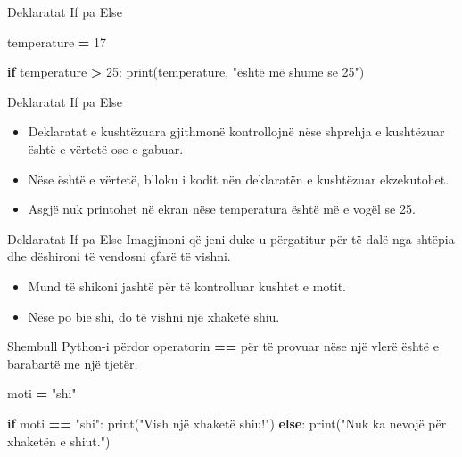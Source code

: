 \documentclass[
  ignorenonframetext,
]{beamer}
\newenvironment{Shaded}{\begin{snugshade}}{\end{snugshade}}
\newcommand{\BuiltInTok}[1]{#1}
\newcommand{\ControlFlowTok}[1]{\textcolor[rgb]{0.13,0.29,0.53}{\textbf{#1}}}
\newcommand{\DecValTok}[1]{\textcolor[rgb]{0.00,0.00,0.81}{#1}}
\newcommand{\NormalTok}[1]{#1}
\newcommand{\OperatorTok}[1]{\textcolor[rgb]{0.81,0.36,0.00}{\textbf{#1}}}
\newcommand{\StringTok}[1]{\textcolor[rgb]{0.31,0.60,0.02}{#1}}
\begin{document}
\begin{frame}[fragile]{Deklaratat If pa Else}
\protect\hypertarget{deklaratat-if-pa-else-1}{}
\begin{Shaded}
\begin{Highlighting}[]
\NormalTok{temperature }\OperatorTok{=} \DecValTok{17}

\ControlFlowTok{if}\NormalTok{ temperature }\OperatorTok{\textgreater{}} \DecValTok{25}\NormalTok{:}
  \BuiltInTok{print}\NormalTok{(temperature, }\StringTok{"është më shume se 25"}\NormalTok{)  }
\end{Highlighting}
\end{Shaded}
\end{frame}

\begin{frame}{Deklaratat If pa Else}
\protect\hypertarget{deklaratat-if-pa-else-2}{}
\begin{itemize}
\item
  Deklaratat e kushtëzuara gjithmonë kontrollojnë nëse shprehja e
  kushtëzuar është e vërtetë ose e gabuar.
\item
  Nëse është e vërtetë, blloku i kodit nën deklaratën e kushtëzuar
  ekzekutohet.
\item
  Asgjë nuk printohet në ekran nëse temperatura është më e vogël se 25.
\end{itemize}
\end{frame}

\begin{frame}{Deklaratat If pa Else}
\protect\hypertarget{deklaratat-if-pa-else-3}{}
Imagjinoni që jeni duke u përgatitur për të dalë nga shtëpia dhe
dëshironi të vendosni çfarë të vishni.

\begin{itemize}
\item
  Mund të shikoni jashtë për të kontrolluar kushtet e motit.
\item
  Nëse po bie shi, do të vishni një xhaketë shiu.
\end{itemize}
\end{frame}

\begin{frame}[fragile]{Shembull}
\protect\hypertarget{shembull}{}
Python-i përdor operatorin \textbf{==} për të provuar nëse një vlerë
është e barabartë me një tjetër.

\begin{Shaded}
\begin{Highlighting}[]
\NormalTok{moti }\OperatorTok{=} \StringTok{"shi"}

\ControlFlowTok{if}\NormalTok{ moti }\OperatorTok{==} \StringTok{"shi"}\NormalTok{:}
  \BuiltInTok{print}\NormalTok{(}\StringTok{"Vish një xhaketë shiu!"}\NormalTok{)}
\ControlFlowTok{else}\NormalTok{:}
  \BuiltInTok{print}\NormalTok{(}\StringTok{"Nuk ka nevojë për xhaketën e shiut."}\NormalTok{)}
\end{Highlighting}
\end{Shaded}
\end{frame}
\end{document}
